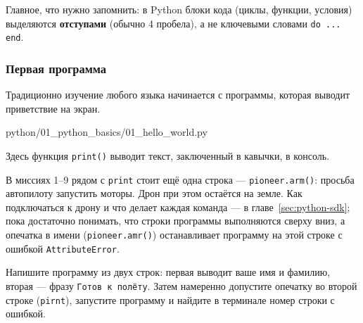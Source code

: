 \begin{infobox}
Главное, что нужно запомнить: в Python блоки кода (циклы, функции, условия) выделяются \textbf{отступами} (обычно 4 пробела), а не ключевыми словами \texttt{do ... end}.
\end{infobox}

\subsubsection*{Первая программа}
Традиционно изучение любого языка начинается с программы, которая выводит приветствие на экран.

\begin{codefile}[python]{python/01_python_basics/01_hello_world.py}
\end{codefile}

Здесь функция \texttt{print()} выводит текст, заключенный в кавычки, в консоль.

\begin{infobox}
В миссиях 1--9 рядом с \verb|print| стоит ещё одна строка --- \verb|pioneer.arm()|: просьба автопилоту запустить моторы. Дрон при этом остаётся на земле. Как подключаться к дрону и что делает каждая команда --- в главе~\ref{sec:python-sdk}; пока достаточно понимать, что строки программы выполняются сверху вниз, а опечатка в имени (\verb|pioneer.amr()|) останавливает программу на этой строке с ошибкой \verb|AttributeError|.
\end{infobox}

\begin{taskbox}
Напишите программу из двух строк: первая выводит ваше имя и фамилию, вторая --- фразу \verb|Готов к полёту|. Затем намеренно допустите опечатку во второй строке (\verb|pirnt|), запустите программу и найдите в терминале номер строки с ошибкой.
\end{taskbox}
